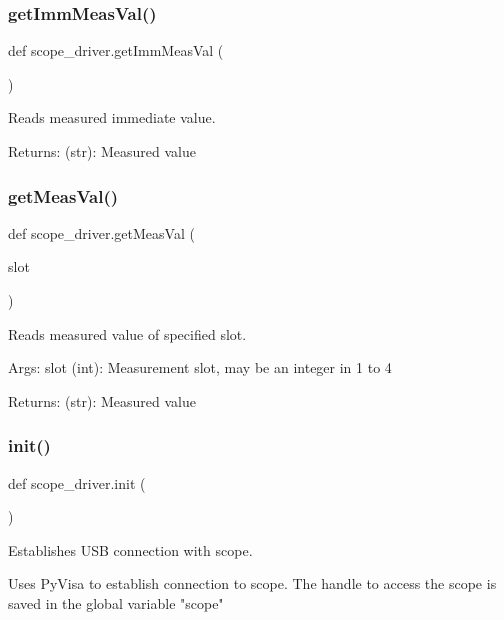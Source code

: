 \subsubsection{\texorpdfstring{get\+Imm\+Meas\+Val()}{getImmMeasVal()}}
{\footnotesize\ttfamily def scope\+\_\+driver.\+get\+Imm\+Meas\+Val (\begin{DoxyParamCaption}{ }\end{DoxyParamCaption})}

\begin{DoxyVerb}Reads measured immediate value.
    
Returns:
    (str): Measured value
\end{DoxyVerb}
 \mbox{\label{namespacescope__driver_a81c43fce6dc0c7f7c942d8173181797a}} 
\subsubsection{\texorpdfstring{get\+Meas\+Val()}{getMeasVal()}}
{\footnotesize\ttfamily def scope\+\_\+driver.\+get\+Meas\+Val (\begin{DoxyParamCaption}\item[{}]{slot }\end{DoxyParamCaption})}

\begin{DoxyVerb}Reads measured value of specified slot.

Args:
    slot (int): Measurement slot, may be an integer in 1 to 4

Returns:
    (str): Measured value
\end{DoxyVerb}
 \mbox{\label{namespacescope__driver_a7dff97e7a734c83b05f8765413706e11}} 
\subsubsection{\texorpdfstring{init()}{init()}}
{\footnotesize\ttfamily def scope\+\_\+driver.\+init (\begin{DoxyParamCaption}{ }\end{DoxyParamCaption})}

\begin{DoxyVerb}Establishes USB connection with scope.

Uses PyVisa to establish connection to scope.
The handle to access the scope is saved in the global variable "scope"
\end{DoxyVerb}
 \mbox{\label{namespacescope__driver_af3354c905fc3521f2346d95214163f8c}} 
